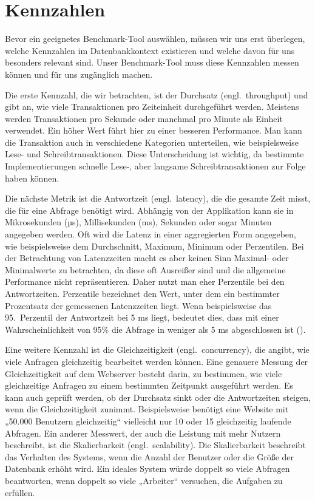 \section{Kennzahlen}\label{sec:einleitung-kennzahlen}

Bevor ein geeignetes Benchmark-Tool auswählen, müssen wir uns erst überlegen, welche Kennzahlen im Datenbankkontext existieren und welche davon für uns besonders relevant sind.
Unser Benchmark-Tool muss diese Kennzahlen messen können und für uns zugänglich machen.

Die erste Kennzahl, die wir betrachten, ist der Durchsatz (engl.\ throughput) und gibt an, wie viele Transaktionen pro Zeiteinheit durchgeführt werden.
Meistens werden Transaktionen pro Sekunde oder manchmal pro Minute als Einheit verwendet.
Ein höher Wert führt hier zu einer besseren Performance.
Man kann die Transaktion auch in verschiedene Kategorien unterteilen, wie beispielsweise Lese- und Schreibtransaktionen.
Diese Unterscheidung ist wichtig, da bestimmte Implementierungen schnelle Lese-, aber langsame Schreibtransaktionen zur Folge haben können.

Die nächste Metrik ist die Antwortzeit (engl.\ latency), die die gesamte Zeit misst, die für eine Abfrage benötigt wird.
Abhängig von der Applikation kann sie in Mikrosekunden (µs), Millisekunden (ms), Sekunden oder sogar Minuten angegeben werden.
Oft wird die Latenz in einer aggregierten Form angegeben, wie beispielsweise dem Durchschnitt, Maximum, Minimum oder Perzentilen.
Bei der Betrachtung von Latenzzeiten macht es aber keinen Sinn Maximal- oder Minimalwerte zu betrachten, da diese oft Ausreißer sind und die allgemeine Performance nicht repräsentieren.
Daher nutzt man eher Perzentile bei den Antwortzeiten.
Perzentile bezeichnet den Wert, unter dem ein bestimmter Prozentsatz der gemessenen Latenzzeiten liegt.
Wenn beispielsweise das 95.\ Perzentil der Antwortzeit bei 5 ms liegt, bedeutet dies, dass mit einer Wahrscheinlichkeit von 95\% die Abfrage in weniger als 5 ms abgeschlossen ist (\cite{perzentil_erklaerung}).

Eine weitere Kennzahl ist die Gleichzeitigkeit (engl.\ concurrency), die angibt, wie viele Anfragen gleichzeitig bearbeitet werden können.
Eine genauere Messung der Gleichzeitigkeit auf dem Webserver besteht darin, zu bestimmen, wie viele gleichzeitige Anfragen zu einem bestimmten Zeitpunkt ausgeführt werden.
Es kann auch geprüft werden, ob der Durchsatz sinkt oder die Antwortzeiten steigen, wenn die Gleichzeitigkeit zunimmt.
Beispielsweise benötigt eine Website mit „50.000 Benutzern gleichzeitig“ vielleicht nur 10 oder 15 gleichzeitig laufende Abfragen.
Ein anderer Messwert, der auch die Leistung mit mehr Nutzern beschreibt, ist die Skalierbarkeit (engl.\ scalability).
Die Skalierbarkeit beschreibt das Verhalten des Systems, wenn die Anzahl der Benutzer oder die Größe der Datenbank erhöht wird.
Ein ideales System würde doppelt so viele Abfragen beantworten, wenn doppelt so viele „Arbeiter“ versuchen, die Aufgaben zu erfüllen.

